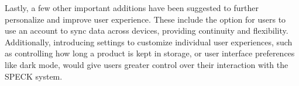 \documentclass[oneside,a4paper,12pt, colorinlistoftodos]{article} %
\begin{document}
Lastly, a few other important additions have been suggested to further personalize and improve user experience. These include the option for users to use an account to sync data across devices, providing continuity and flexibility. Additionally, introducing settings to customize individual user experiences, such as controlling how long a product is kept in storage, or user interface preferences like dark mode, would give users greater control over their interaction with the SPECK system. 


\appendix %



\newpage

\newpage
\end{document}
